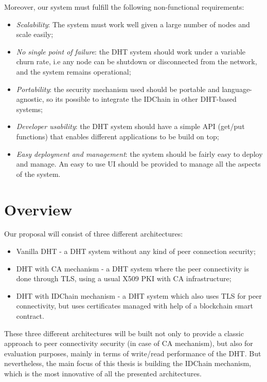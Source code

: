 Moreover, our system must fulfill the following non-functional requirements:

\begin{itemize}
  \item \textit{Scalability}: The system must work well given a large number of nodes and scale easily;
  \item \textit{No single point of failure}: the DHT system should work under a variable churn rate, i.e any node can be shutdown or disconnected from the network, and the system remains operational;
  \item \textit{Portability}: the security mechanism used should be portable and language-agnostic, so its possible to integrate the IDChain in other DHT-based systems;
  \item \textit{Developer usability}: the DHT system should have a simple API (get/put functions) that enables different applications to be build on top;
  \item \textit{Easy deployment and management}: the system should be fairly easy to deploy and manage. An easy to use \ac{UI} should be provided to manage all the aspects of the system.
\end{itemize}

\section{Overview}\label{architecture:overview}

Our proposal will consist of three different architectures:

\begin{itemize}
  \item Vanilla \ac{DHT} - a \ac{DHT} system without any kind of peer connection security;
  \item DHT with \ac{CA} mechanism - a \ac{DHT} system where the peer connectivity is done through TLS, using a usual X509 \ac{PKI} with \ac{CA} infrastructure;
  \item DHT with IDChain mechanism - a \ac{DHT} system which also uses TLS for peer connectivity, but uses certificates managed with help of a blockchain smart contract.
\end{itemize}

These three different architectures will be built not only to provide a classic approach to peer connectivity security (in case of \ac{CA} mechanism), but also for evaluation purposes, mainly in terms of write/read performance of the \ac{DHT}.
But nevertheless, the main focus of this thesis is building the IDChain mechanism, which is the most innovative of all the presented architectures.

